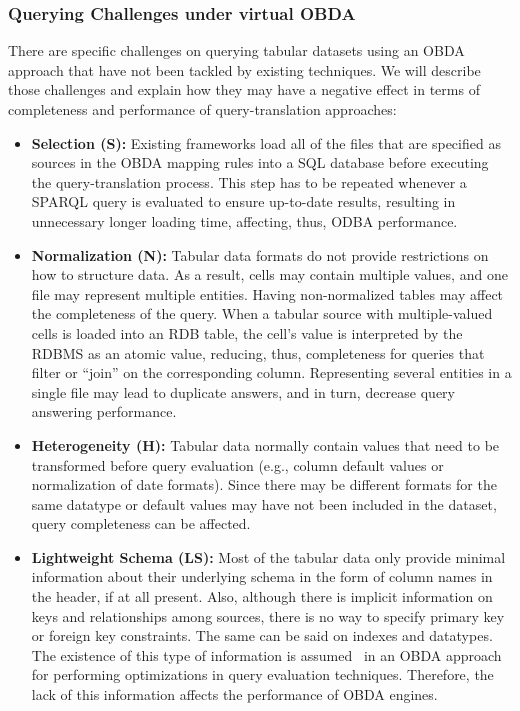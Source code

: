 \subsubsection{Querying Challenges under virtual OBDA}
There are specific challenges on querying tabular datasets using an OBDA approach that have not been tackled by existing techniques. We will describe those challenges and explain how they may have a negative effect in terms of completeness and performance of query-translation approaches:
\begin{itemize}
    \item \textbf{Selection (S):} Existing frameworks load all of the files that are specified as sources in the OBDA mapping rules into a SQL database before executing the query-translation process. This step has to be repeated whenever a SPARQL query is evaluated to ensure up-to-date results, resulting in unnecessary longer loading time, affecting, thus, ODBA performance.
    \item \textbf{Normalization (N):} Tabular data formats do not provide restrictions on how to structure data. As a result, cells may contain multiple values, and one file may represent multiple entities. Having non-normalized tables may affect the completeness of the query. When a tabular source with multiple-valued cells is loaded into an RDB table, the cell's value is interpreted by the RDBMS as an atomic value, reducing, thus, completeness for queries that filter or ``join'' on the corresponding column. Representing several entities in a single file may lead to duplicate answers, and in turn, decrease query answering performance.
    \item\textbf{Heterogeneity (H):} Tabular data normally contain values that need to be transformed before query evaluation (e.g., column default values or normalization of date formats). Since there may be different formats for the same datatype or default values may have not been included in the dataset, query completeness can be affected.
    \item \textbf{Lightweight Schema (LS):} Most of the tabular data only provide minimal information about their underlying schema in the form of column names in the header, if at all present. Also, although there is implicit information on keys and relationships among sources, there is no way to specify primary key or foreign key constraints. The same can be said on indexes and datatypes. The existence of this type of information is assumed~\citep{xiao2018obdasurvey} in an OBDA approach for performing optimizations in query evaluation techniques. Therefore, the lack of this information affects the performance of OBDA engines.
\end{itemize}

